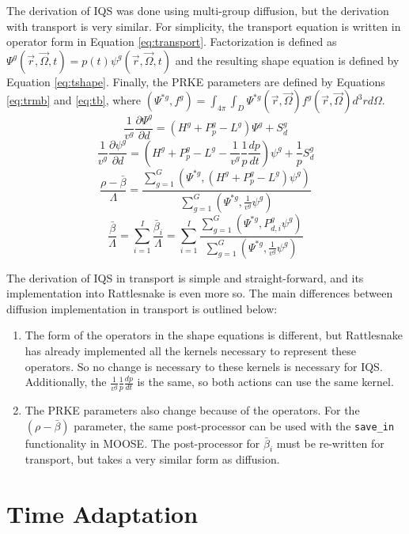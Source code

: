 \documentclass[12pt]{scrartcl}
\newcommand{\be}{\begin{equation}}
\newcommand{\ee}{\end{equation}}
\begin{document}
The derivation of IQS was done using multi-group diffusion, but the derivation with transport is very similar.  For simplicity, the transport equation is written in operator form in Equation \ref{eq:transport}.  Factorization is defined as $\Psi^g(\vec{r},\vec{\Omega},t)=p(t)\psi^g(\vec{r},\vec{\Omega},t)$ and the resulting shape equation is defined by Equation \ref{eq:tshape}.  Finally, the PRKE parameters are defined by Equations \ref{eq:trmb} and \ref{eq:tb}, where $\left(\Psi^{*g},f^g\right) = \int_{4\pi}\int_D \Psi^{*g}(\vec{r},\vec{\Omega})f^g(\vec{r},\vec{\Omega})d^3r d\Omega$.
\be
\frac{1}{v^g}\frac{\partial \Psi^g}{\partial d} = \left(H^g + P_p^g - L^g\right)\Psi^g + S_d^g
\label{eq:transport}
\ee
\be
\frac{1}{v^g}\frac{\partial \psi^g}{\partial d} = \left(H^g + P_p^g - L^g - \frac{1}{v^g}\frac{1}{p}\frac{dp}{dt}\right)\psi^g + \frac{1}{p} S_d^g
\label{eq:tshape}
\ee
\be
\frac{\rho-\bar{\beta}}{\Lambda}=\frac{ \sum_{g=1}^G\left(\Psi^{*g},(H^g+P_p^g-L^g)\psi^g\right)}{\sum_{g=1}^G\left(\Psi^{*g},\frac{1}{v^g}\psi^g\right)}
\label{eq:trmb}
\ee
\be
\frac{\bar{\beta}}{\Lambda}=\sum_{i=1}^I\frac{\bar{\beta}_i}{\Lambda}=\sum_{i=1}^I\frac{\sum_{g=1}^G(\Psi^{*g}, P_{d,i}^g \psi^g)}{\sum_{g=1}^G\left(\Psi^{*g},\frac{1}{v^g}\psi^g\right)}
\label{eq:tb}
\ee

The derivation of IQS in transport is simple and straight-forward, and its implementation into Rattlesnake is even more so.  The main differences between diffusion implementation in transport is outlined below:
\begin{enumerate}
\item The form of the operators in the shape equations is different, but Rattlesnake has already implemented all the kernels necessary to represent these operators.  So no change is necessary to these kernels is necessary for IQS.  Additionally, the $\frac{1}{v^g}\frac{1}{p}\frac{dp}{dt}$ is the same, so both actions can use the same kernel.
\item The PRKE parameters also change because of the operators.  For the $(\rho-\bar{\beta})$ parameter, the same post-processor can be used with the \texttt{save\_in} functionality in MOOSE.  The post-processor for $\bar{\beta}_i$ must be re-written for transport, but takes a very similar form as diffusion.
\end{enumerate}


\section{Time Adaptation}
\end{document}
